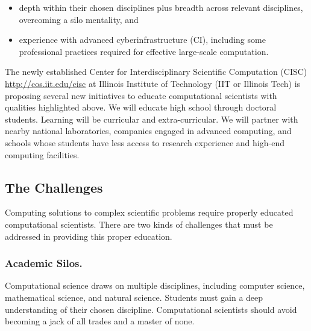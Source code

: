 \documentclass[11pt]{NSFamsart}
\begin{document}
\begin{itemize}
\item depth within their chosen disciplines plus breadth across relevant disciplines, overcoming a silo mentality, and
\item experience with advanced cyberinfrastructure (CI), including some professional practices required for effective large-scale computation.
\end{itemize}

The newly established Center for Interdisciplinary Scientific Computation (CISC) \url{http://cos.iit.edu/cisc} at Illinois Institute of Technology (IIT or Illinois Tech) is proposing several new initiatives to educate computational scientists with qualities highlighted above.  We will educate high school through doctoral students.  Learning will be curricular and extra-curricular.  We will partner with nearby national laboratories, companies engaged in advanced computing, and schools whose students have less access to research experience and high-end computing facilities.

\subsection*{The Challenges}
Computing solutions to complex scientific problems require properly educated computational scientists.  There are two kinds of challenges that must be addressed in providing this proper education.

\subsubsection*{Academic Silos.} Computational science draws on multiple disciplines, including computer science, mathematical science, and natural science.  Students must gain a deep understanding of their chosen discipline. Computational scientists should avoid becoming a jack of all trades and a master of none.
\end{document}
